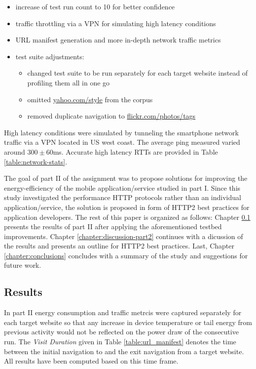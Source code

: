 \documentclass{article}
\begin{document}
\begin{itemize}
    \item increase of test run count to 10 for better confidence
    \item traffic throttling via a VPN for simulating high latency conditions
    \item URL manifest generation and more in-depth network traffic metrics
    \item test suite adjustments:
        \begin{itemize}
        \item changed test suite to be run separately for each target website instead of profiling them all in one go
        \item omitted \url{yahoo.com/style} from the corpus
        \item removed duplicate navigation to \url{flickr.com/photos/tags}
        \end{itemize}
\end{itemize}

High latency conditions were simulated by tunneling the smartphone network traffic via a VPN located in US west coast. The average ping measured varied around $300\pm60$ms. Accurate high latency RTTs are provided in Table \ref{table:network-stats}.

The goal of part II of the assignment was to propose solutions for improving the energy-efficiency of the mobile application/service studied in part I. Since this study investigated the performance HTTP protocols rather than an individual application/service, the solution is proposed in form of HTTP2 best practices for application developers. The rest of this paper is organized as follows: Chapter \ref{chapter:results-part2} presents the results of part II after applying the aforementioned testbed improvements. Chapter \ref{chapter:discussion-part2} continues with a dicussion of the results and presents an outline for HTTP2 best practices. Last, Chapter \ref{chapter:conclusions} concludes with a summary of the study and suggestions for future work.

\subsection{Results}
\label{chapter:results-part2}

In part II energy consumption and traffic metrcis were captured separately for each target website so that any increase in device temperature or tail energy from previous activity would not be reflected on the power draw of the consecutive run. The \emph{Visit Duration} given in Table \ref{table:url_manifest} denotes the time between the initial navigation to and the exit navigation from a target website. All results have been computed based on this time frame.
\end{document}
